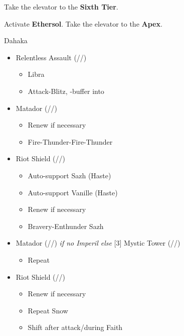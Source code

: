 \begin{multicols}{2}
  \renewcommand{\first}{[1] Riot Shield (\syn/\sen/\rav)}
  \renewcommand{\second}{[2] Relentless Assault (\com/\rav/\rav)}
  \renewcommand{\third}{[3] Mystic Tower (\rav/\sen/\rav)}
  \renewcommand{\fourth}{[4] Aggression (\com/\com/\rav)}
  \renewcommand{\fifth}{[5] Matador (\rav/\sen/\sab)}
  \renewcommand{\sixth}{[6] Aggression (\com/\com/\rav)}

  Take the elevator to the \textbf{Sixth Tier}.

  Activate \textbf{Ethersol}.
  Take the elevator to the \textbf{Apex}.

  \begin{battle}{Dahaka}
    \begin{itemize}
      \item \second
            \begin{itemize}
              \item Libra
              \item Attack-Blitz, \rav-buffer into
            \end{itemize}
      \item \fifth
            \begin{itemize}
              \item Renew if necessary
              \item Fire-Thunder-Fire-Thunder
            \end{itemize}
      \item \first
            \begin{itemize}
              \item Auto-support Sazh (Haste)
              \item Auto-support Vanille (Haste)
              \item Renew if necessary
              \item Bravery-Enthunder Sazh
            \end{itemize}
      \item \fifth \textit{ if no Imperil else } \third
            \begin{itemize}
              \item Repeat
            \end{itemize}
      \item \first
            \begin{itemize}
              \item Renew if necessary
              \item Repeat Snow
              \item Shift after attack/during Faith

\end{itemize}
\end{itemize}
\end{battle}
\end{multicols}

